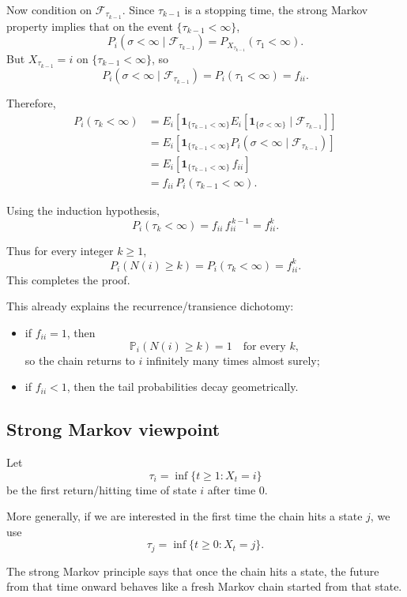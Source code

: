 \documentclass[11pt]{article}
\theoremstyle{definition}
\begin{document}
Now condition on \(\mathcal{F}_{\tau_{k-1}}\). Since \(\tau_{k-1}\) is a stopping time, the strong Markov property implies that on the event \(\{\tau_{k-1}<\infty\}\),
\[
P_i(\sigma<\infty\mid \mathcal{F}_{\tau_{k-1}})
=
P_{X_{\tau_{k-1}}}(\tau_1<\infty).
\]
But \(X_{\tau_{k-1}}=i\) on \(\{\tau_{k-1}<\infty\}\), so
\[
P_i(\sigma<\infty\mid \mathcal{F}_{\tau_{k-1}})
=
P_i(\tau_1<\infty)
=
f_{ii}.
\]

Therefore,
\[
\begin{aligned}
P_i(\tau_k<\infty)
&=
E_i\!\left[
\mathbf{1}_{\{\tau_{k-1}<\infty\}}
E_i\!\left[\mathbf{1}_{\{\sigma<\infty\}}\mid \mathcal{F}_{\tau_{k-1}}\right]
\right] \\
&=
E_i\!\left[
\mathbf{1}_{\{\tau_{k-1}<\infty\}}
P_i(\sigma<\infty\mid \mathcal{F}_{\tau_{k-1}})
\right] \\
&=
E_i\!\left[
\mathbf{1}_{\{\tau_{k-1}<\infty\}}\,f_{ii}
\right] \\
&=
f_{ii}\,P_i(\tau_{k-1}<\infty).
\end{aligned}
\]

Using the induction hypothesis,
\[
P_i(\tau_k<\infty)
=
f_{ii}\,f_{ii}^{\,k-1}
=
f_{ii}^k.
\]

Thus for every integer \(k\ge 1\),
\[
P_i(N(i)\ge k)=P_i(\tau_k<\infty)=f_{ii}^k.
\]
This completes the proof.

This already explains the recurrence/transience dichotomy:
\begin{itemize}[leftmargin=2em]
    \item if \(f_{ii}=1\), then
    \[
    \mathbb P_i(N(i)\ge k)=1 \quad \text{for every } k,
    \]
    so the chain returns to \(i\) infinitely many times almost surely;
    \item if \(f_{ii}<1\), then the tail probabilities decay geometrically.
\end{itemize}

\subsection{Strong Markov viewpoint}

Let
\[
\tau_i=\inf\{t\ge 1:X_t=i\}
\]
be the first return/hitting time of state \(i\) after time \(0\).

More generally, if we are interested in the first time the chain hits a state \(j\), we use
\[
\tau_j=\inf\{t\ge 0:X_t=j\}.
\]

The strong Markov principle says that once the chain hits a state, the future from that time onward behaves like a fresh Markov chain started from that state.
\end{document}

